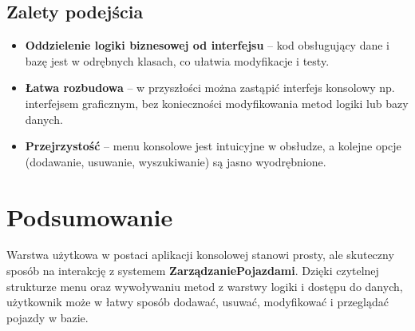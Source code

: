 \subsection{Zalety podejścia}
\begin{itemize}
    \item \textbf{Oddzielenie logiki biznesowej od interfejsu} -- kod obsługujący dane i bazę jest w odrębnych klasach, 
    co ułatwia modyfikacje i testy.
    \item \textbf{Łatwa rozbudowa} -- w przyszłości można zastąpić interfejs konsolowy np. interfejsem graficznym, 
    bez konieczności modyfikowania metod logiki lub bazy danych.
    \item \textbf{Przejrzystość} -- menu konsolowe jest intuicyjne w obsłudze, a kolejne opcje (dodawanie, usuwanie, 
    wyszukiwanie) są jasno wyodrębnione.
\end{itemize}

\section{Podsumowanie}
Warstwa użytkowa w postaci aplikacji konsolowej stanowi prosty, ale skuteczny sposób 
na interakcję z systemem \textbf{ZarządzaniePojazdami}. Dzięki czytelnej strukturze menu 
oraz wywoływaniu metod z warstwy logiki i dostępu do danych, użytkownik może w łatwy sposób 
dodawać, usuwać, modyfikować i przeglądać pojazdy w bazie.




